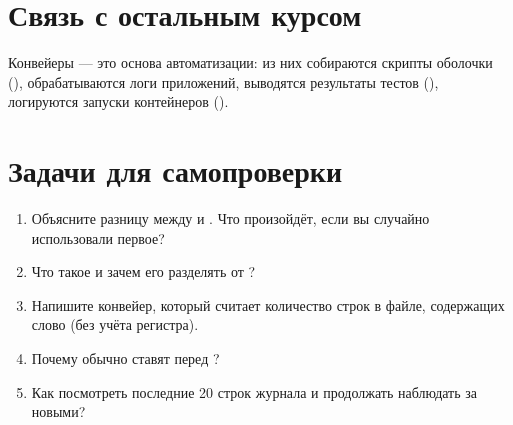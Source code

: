 \section{Связь с остальным курсом}

Конвейеры --- это основа автоматизации: из них собираются
скрипты оболочки (),
обрабатываются логи приложений, выводятся результаты
тестов (), логируются
запуски контейнеров ().

\section{Задачи для самопроверки}
\begin{enumerate}
  \item Объясните разницу между \cmd{>} и \cmd{>>}. Что
    произойдёт, если вы случайно использовали первое?
  \item Что такое  и зачем его разделять от
    ?
  \item Напишите конвейер, который считает количество
    строк в файле, содержащих слово 
    (без учёта регистра).
  \item Почему  обычно ставят перед ?
  \item Как посмотреть последние 20 строк журнала и
    продолжать наблюдать за новыми?
\end{enumerate}
